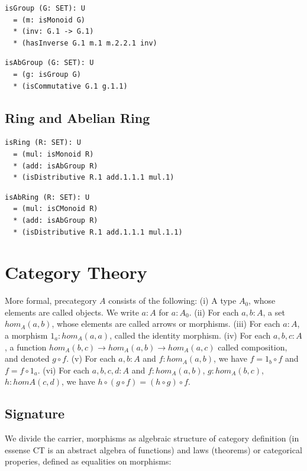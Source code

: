 \documentclass{article}
\begin{document}
\begin{lstlisting}[mathescape=true]
isGroup (G: SET): U
  = (m: isMonoid G)
  * (inv: G.1 -> G.1)
  * (hasInverse G.1 m.1 m.2.2.1 inv)
\end{lstlisting}

\begin{lstlisting}[mathescape=true]
isAbGroup (G: SET): U
  = (g: isGroup G)
  * (isCommutative G.1 g.1.1)
\end{lstlisting}

\subsection{Ring and Abelian Ring}

\begin{lstlisting}[mathescape=true]
isRing (R: SET): U
  = (mul: isMonoid R)
  * (add: isAbGroup R)
  * (isDistributive R.1 add.1.1.1 mul.1)
\end{lstlisting}

\begin{lstlisting}[mathescape=true]
isAbRing (R: SET): U
  = (mul: isCMonoid R)
  * (add: isAbGroup R)
  * (isDistributive R.1 add.1.1.1 mul.1.1)
\end{lstlisting}

\newpage
\section{Category Theory}

More formal, precategory $A$ consists of the following:
(i)   A type $A_0$, whose elements are called objects. We write $a: A$ for $a: A_0$.
(ii)  For each $a,b: A$, a set $hom_A(a,b)$, whose elements are called arrows or morphisms.
(iii) For each $a: A$, a morphism $1_a : hom_A(a,a)$, called the identity morphism.
(iv)  For each $a,b,c: A$, a function $hom_A(b,c) \rightarrow hom_A(a,b) \rightarrow hom_A(a,c)$
      called composition, and denoted $g \circ f$.
(v)   For each $a,b: A$ and $f: hom_A(a,b)$, we have $f = 1_b \circ f$ and $f = f \circ 1_a$.
(vi)  For each $a,b,c,d: A$ and $f: hom_A(a,b)$, $g: hom_A(b,c)$, $h: homA(c,d)$,
      we have $h \circ (g \circ f ) = (h \circ g) \circ f$.

\subsection{Signature}

We divide the carrier, morphisms as algebraic structure of category
definition (in essense CT is an abstract algebra of functions) and laws (theorems)
or categorical properies, defined as equalities on morphisms:
\end{document}
